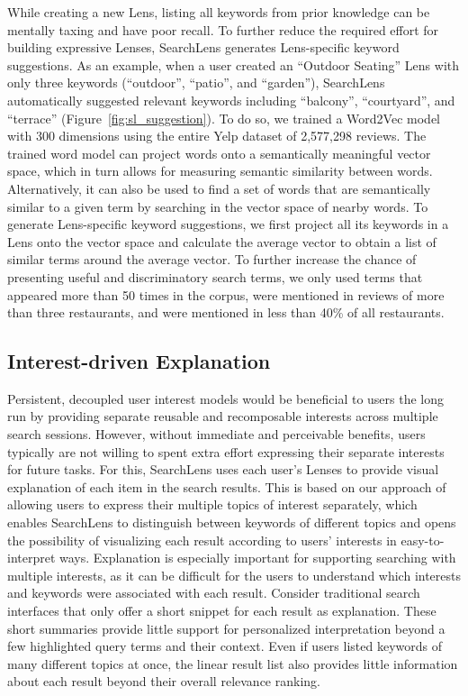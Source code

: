 While creating a new Lens, listing all keywords from prior knowledge can be mentally taxing and have poor recall. To further reduce the required effort for building expressive Lenses, SearchLens generates Lens-specific keyword suggestions. As an example, when a user created an ``Outdoor Seating'' Lens with only three keywords (``outdoor'', ``patio'', and ``garden''), SearchLens automatically suggested relevant keywords including ``balcony'', ``courtyard'', and ``terrace'' (Figure~\ref{fig:sl_suggestion}). To do so, we trained a Word2Vec model \cite{mikolov2013efficient} with 300 dimensions using the entire Yelp dataset of 2,577,298 reviews. The trained word model can project words onto a semantically meaningful vector space, which in turn allows for measuring semantic similarity between words. Alternatively, it can also be used to find a set of words that are semantically similar to a given term by searching in the vector space of nearby words. To generate Lens-specific keyword suggestions, we first project all its keywords in a Lens onto the vector space and calculate the average vector to obtain a list of similar terms around the average vector. To further increase the chance of presenting useful and discriminatory search terms, we only used terms that appeared more than 50 times in the corpus, were mentioned in reviews of more than three restaurants, and were mentioned in less than 40\% of all restaurants.


\subsection{Interest-driven Explanation}

Persistent, decoupled user interest models would be beneficial to users the long run by providing separate reusable and recomposable interests across multiple search sessions. However, without immediate and perceivable benefits, users typically are not willing to spent extra effort expressing their separate interests for future tasks. For this, SearchLens uses each user's Lenses to provide visual explanation of each item in the search results. This is based on our approach of allowing users to express their multiple topics of interest separately, which enables SearchLens to distinguish between keywords of different topics and opens the possibility of visualizing each result according to users' interests in easy-to-interpret ways. Explanation is especially important for supporting searching with multiple interests, as it can be difficult for the users to understand which interests and keywords were associated with each result. Consider traditional search interfaces that only offer a short snippet for each result as explanation. These short summaries provide little support for personalized interpretation beyond a few highlighted query terms and their context. Even if users listed keywords of many different topics at once, the linear result list also provides little information about each result beyond their overall relevance ranking.

